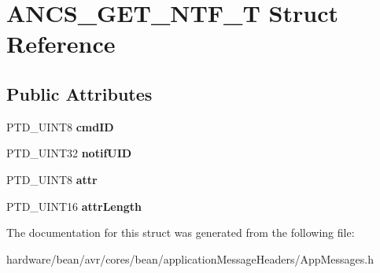 \hypertarget{struct_a_n_c_s___g_e_t___n_t_f___t}{}\section{A\+N\+C\+S\+\_\+\+G\+E\+T\+\_\+\+N\+T\+F\+\_\+\+T Struct Reference}
\label{struct_a_n_c_s___g_e_t___n_t_f___t}
\subsection*{Public Attributes}
\begin{DoxyCompactItemize}
\item 
\hypertarget{struct_a_n_c_s___g_e_t___n_t_f___t_af6470e407966b42dbb146b0fe9278c60}{}P\+T\+D\+\_\+\+U\+I\+N\+T8 {\bfseries cmd\+I\+D}\label{struct_a_n_c_s___g_e_t___n_t_f___t_af6470e407966b42dbb146b0fe9278c60}

\item 
\hypertarget{struct_a_n_c_s___g_e_t___n_t_f___t_a875eaed32ae49fbac64055d74e400085}{}P\+T\+D\+\_\+\+U\+I\+N\+T32 {\bfseries notif\+U\+I\+D}\label{struct_a_n_c_s___g_e_t___n_t_f___t_a875eaed32ae49fbac64055d74e400085}

\item 
\hypertarget{struct_a_n_c_s___g_e_t___n_t_f___t_aee990866ce9075ccf5f1f2fa315da45c}{}P\+T\+D\+\_\+\+U\+I\+N\+T8 {\bfseries attr}\label{struct_a_n_c_s___g_e_t___n_t_f___t_aee990866ce9075ccf5f1f2fa315da45c}

\item 
\hypertarget{struct_a_n_c_s___g_e_t___n_t_f___t_a70ae10e567b1f52c19992b7d1abbf43e}{}P\+T\+D\+\_\+\+U\+I\+N\+T16 {\bfseries attr\+Length}\label{struct_a_n_c_s___g_e_t___n_t_f___t_a70ae10e567b1f52c19992b7d1abbf43e}

\end{DoxyCompactItemize}


The documentation for this struct was generated from the following file\+:\begin{DoxyCompactItemize}
\item 
hardware/bean/avr/cores/bean/application\+Message\+Headers/App\+Messages.\+h\end{DoxyCompactItemize}
